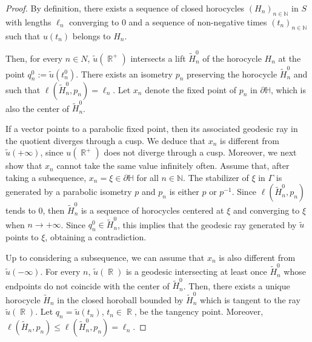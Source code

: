 \documentclass[a4paper,english,reqno]{amsart}
\DeclareMathOperator{\reals}{\mathbb{R}}
\renewcommand{\H}{\mathbb{H}}
\newcommand{\N}{\mathbb{N}} %
\theoremstyle{definition}
\numberwithin{equation}{section}
\begin{document}
\begin{proof}
	By definition, there exists a sequence of closed horocycles $(H_n)_{n\in \N}$ in $S$ with lengths $\ell_n$ converging to $0$ and a sequence of non-negative times $(t_n)_{n\in \N}$ such that $u(t_n)$ belongs to $H_n$.
	
	
	Then, for every $n\in N$, $\tilde u(\reals^+)$ intersects a lift $\tilde H_n^0$ of the horocycle $H_n$ at the point $q_n^0:=\tilde u (t_n^0)$. There exists an isometry $p_n$ preserving the horocycle $\tilde H_n^0$ and such that $\ell(\tilde H_n^0 , p_n) = \ell_n$. Let $x_n$ denote the fixed point of $p_n$ in $\partial \H$, which is also the center of $\tilde H_n^0$.
	
	If a vector points to a parabolic fixed point, then its associated geodesic ray in the quotient diverges through a cusp. We deduce that $x_n$ is different from $\tilde u(+\infty)$, since $u(\reals^+)$ does not diverge through a cusp. Moreover, we next show that $x_n$ cannot take the same value infinitely often. Assume that, after taking a subsequence, $x_n=\xi \in \partial \H$ for all $n\in \N$. The stabilizer of $\xi$ in $\Gamma$ is generated by a parabolic isometry $p$ and $p_n$ is either $p$ or $p^{-1}$. Since $\ell (\tilde H_n^0 , p_n)$ tends to $0$, then $\tilde H_n^0$ is a sequence of horocycles centered at $\xi$ and converging to $\xi$ when $n\to +\infty$. Since $q_n^0\in \tilde H_n^0$, this implies that the geodesic ray generated by $\tilde u$ points to $\xi$, obtaining a contradiction.
	
	Up to considering a subsequence, we can assume that $x_n$ is also different from $\tilde u(-\infty)$. For every $n$, $\tilde u(\reals)$ is a geodesic intersecting at least once $\tilde H_n^0$ whose endpoints do not coincide with the center of $\tilde H_n^0$. Then, there exists a unique horocycle $\tilde H_n$ in the closed horoball bounded by $\tilde H_n^0$ which is tangent to the ray $\tilde u (\reals )$. Let $q_n=\tilde u (t_n)$, $t_n\in \reals$, be the tangency point. Moreover, $\ell(\tilde H_n,p_n)\le\ell(\tilde H_n^0,p_n)=\ell_n$.  
	

\end{proof}
\end{document}
